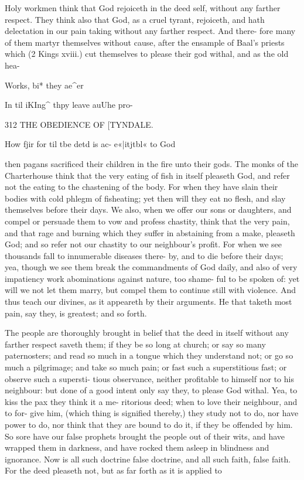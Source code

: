 \documentclass{custom}
\begin{document}
{Holy workmen think that God rejoiceth in the deed 
self, without any farther respect. They think also that 
God, as a cruel tyrant, rejoiceth, and hath delectation in 
our pain taking without any farther respect. And there- 
fore many of them martyr themselves without cause, after 
the ensample of Baal's priests which (2 Kings xviii.) cut 
themselves to please their god withal, and as the old hea- 

Works, bi* 
they ae^er 

In til iKIng^ 
thpy leave 
auUhe pro- 


312
THE OBEDIENCE OF
[TYNDALE.

How fjir 
for til tbe 
detd is ac- 
e«|itjtbl« to 
God 

then pagans sacrificed their children in the fire unto their 
gods. The monks of the Charterhouse think that the very 
eating of fish in itself pleaseth God, and refer not the 
eating to the chastening of the body. For when they have 
slain their bodies with cold phlegm of fisheating; yet then 
will they eat no flesh, and slay themselves before their 
days. We also, when we offer our sons or daughters, and 
compel or persuade them to vow and profess chastity, 
think that the very pain, and that rage and burning which 
they suffer in abstaining from a make, pleaseth God; and 
so refer not our chastity to our neighbour's profit. For 
when we see thousands fall to innumerable diseases there- 
by, and to die before their days; yea, though we see them 
break the commandments of God daily, and also of very 
impatiency work abominations against nature, too shame- 
ful to be spoken of: yet will we not let them marry, but 
compel them to continue still with violence. And thus 
teach our divines, as it appeareth by their arguments. He 
that taketh most pain, say they, is greatest; and so forth. 

The people are thoroughly brought in belief that the 
deed in itself without any farther respect saveth them; 
if they be so long at church; or say so many paternosters; 
and read so much in a tongue which they understand not; 
or go so much a pilgrimage; and take so much pain; or 
fast such a superstitious fast; or observe such a supersti- 
tious observance, neither profitable to himself nor to his 
neighbour: but done of a good intent only say they, to 
please God withal. Yea, to kiss the pax they think it a me- 
ritorious deed; when to love their neighbour, and to for- 
give him, (which thing is signified thereby,) they study not 
to do, nor have power to do, nor think that they are 
bound to do it, if they be offended by him. So sore 
have our false prophets brought the people out of their 
wits, and have wrapped them in darkness, and have rocked 
them asleep in blindness and ignorance. Now is all such 
doctrine false doctrine, and all such faith, false faith. For 
the deed pleaseth not, but as far forth as it is applied to 


}
\end{document}
